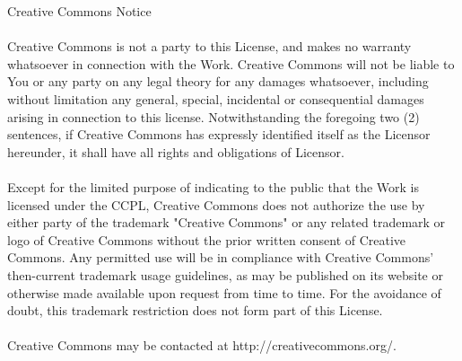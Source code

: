 Creative Commons Notice
\\ \\
    Creative Commons is not a party to this License, and makes no warranty
    whatsoever in connection with the Work. Creative Commons will not be liable
    to You or any party on any legal theory for any damages whatsoever,
    including without limitation any general, special, incidental or
    consequential damages arising in connection to this license. Notwithstanding
    the foregoing two (2) sentences, if Creative Commons has expressly
    identified itself as the Licensor hereunder, it shall have all rights and
    obligations of Licensor.
\\ \\
    Except for the limited purpose of indicating to the public that the Work is
    licensed under the CCPL, Creative Commons does not authorize the use by
    either party of the trademark "Creative Commons" or any related trademark or
    logo of Creative Commons without the prior written consent of Creative
    Commons. Any permitted use will be in compliance with Creative Commons'
    then-current trademark usage guidelines, as may be published on its website
    or otherwise made available upon request from time to time. For the
    avoidance of doubt, this trademark restriction does not form part of this
    License.
\\ \\
    Creative Commons may be contacted at http://creativecommons.org/.
